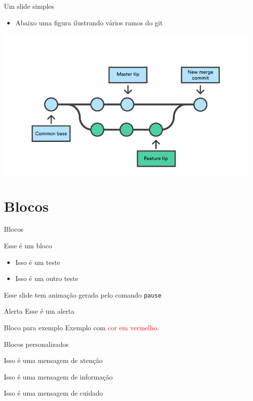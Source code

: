 \documentclass{beamer}
\begin{document}
\begin{frame}{Um slide simples}
\begin{itemize}
    \item Abaixo uma figura ilustrando vários ramos do git
\end{itemize}
\begin{center}
    \includegraphics[width=.8\linewidth]{figs/git-branch}
\end{center}
\end{frame}


\section{Blocos}


\begin{frame}{Blocos}
	\begin{block}{Esse é um bloco}
    \begin{itemize}
        \item Isso é um teste
        \item Isso é um outro teste
    \end{itemize}
	\end{block}

	\begin{block}{}
	    Esse slide tem animação gerada pelo comando \texttt{pause}
	\end{block}

    \pause

	\begin{alertblock}{Alerta}
        Esse é um alerta
	\end{alertblock}

	\begin{exampleblock}{Bloco para exemplo}
        Exemplo com \textcolor{red}{cor em vermelho}.
    \end{exampleblock}

\end{frame}


\begin{frame}{Blocos personalizados}
    \begin{atencao}
        Isso é uma mensagem de atenção
    \end{atencao}
    \begin{informacao}
        Isso é uma mensagem de informação
    \end{informacao}
    \begin{cuidado}
        Isso é uma mensagem de cuidado
    \end{cuidado}
    
    \end{frame}
\end{document}
